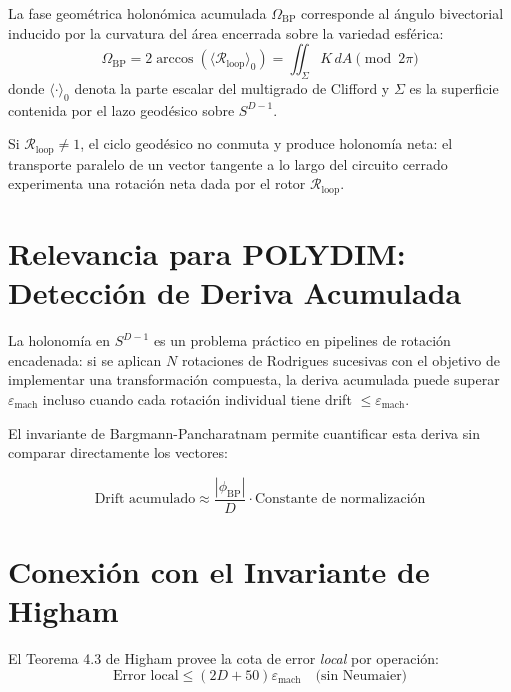 La fase geométrica holonómica acumulada $\Omega_{\text{BP}}$ corresponde al ángulo bivectorial inducido por la curvatura del área encerrada sobre la variedad esférica:
\begin{equation}
\Omega_{\text{BP}} = 2 \arccos\left(\langle \mathcal{R}_{\text{loop}} \rangle_0\right) = \iint_{\Sigma} K \, dA \pmod{2\pi}
\end{equation}
donde $\langle \cdot \rangle_0$ denota la parte escalar del multigrado de Clifford y $\Sigma$ es la superficie contenida por el lazo geodésico sobre $S^{D-1}$.

\begin{proposition}
Si $\mathcal{R}_{\text{loop}} \ne 1$, el ciclo geodésico no conmuta y produce holonomía neta: el transporte paralelo de un vector tangente a lo largo del circuito cerrado experimenta una rotación neta dada por el rotor $\mathcal{R}_{\text{loop}}$.
\end{proposition}

\section{Relevancia para POLYDIM: Detección de Deriva Acumulada}

La holonomía en $S^{D-1}$ es un problema práctico en pipelines de rotación encadenada:
si se aplican $N$ rotaciones de Rodrigues sucesivas con el objetivo de implementar
una transformación compuesta, la deriva acumulada puede superar $\varepsilon_{\text{mach}}$
incluso cuando cada rotación individual tiene drift $\le \varepsilon_{\text{mach}}$.

El invariante de Bargmann-Pancharatnam permite cuantificar esta deriva sin comparar
directamente los vectores:

\begin{equation}
\text{Drift acumulado} \approx \frac{|\phi_{\text{BP}}|}{D} \cdot \text{Constante de normalización}
\end{equation}

\section{Conexión con el Invariante de Higham}

El Teorema 4.3 de Higham provee la cota de error \textit{local} por operación:
\begin{equation}
\text{Error local} \le (2D + 50)\varepsilon_{\text{mach}} \quad \text{(sin Neumaier)}
\end{equation}

